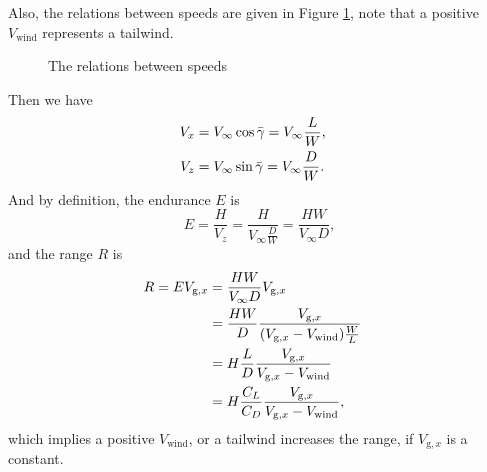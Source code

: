 \documentclass{article}
\begin{document}
Also, the relations between speeds are given in Figure \ref{fig:velocities}, note that a positive $V_{\text{wind}}$ represents a tailwind.
\begin{figure}[!htp]
  \centering

  
  \caption{The relations between speeds}
  \label{fig:velocities}
\end{figure}

Then we have
\[\begin{aligned}
V_{x} & = V_{\infty} \cos \bar{\gamma} = V_{\infty} \frac{L}{W}, \cr
V_{z} & = V_{\infty} \sin \bar{\gamma} = V_{\infty} \frac{D}{W}. \cr
\end{aligned}\]
And by definition, the endurance $E$ is
\[
E = \frac{H}{V_{z}} = \frac{H}{V_{\infty} \frac{D}{W}} = \frac{HW}{V_{\infty} D},
\]
and the range $R$ is
\[\begin{aligned}
R = E V_{\text{g}, x}
& = \frac{HW}{V_{\infty} D} V_{\text{g}, x} \cr
& = \frac{HW}{D} \frac{V_{\text{g}, x}}{(V_{\text{g}, x} - V_{\text{wind}}) \frac{W}{L}} \cr
& = H \frac{L}{D} \frac{V_{\text{g}, x}}{V_{\text{g}, x} - V_{\text{wind}}} \cr
& = H \frac{C_{L}}{C_{D}} \frac{V_{\text{g}, x}}{V_{\text{g}, x} - V_{\text{wind}}},
\end{aligned}\]
which implies a positive $V_{\text{wind}}$, or a tailwind increases the range, if $V_{\text{g}, x}$ is a constant.
\end{document}
